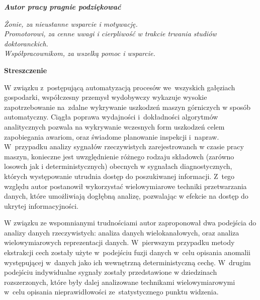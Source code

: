 \documentclass[a4paper,onecolumn,twoside,12pt]{mwrep}
\begin{document}
\vspace*{21\baselineskip}

\begin{center}
	\textit{
\textbf{Autor pracy pragnie podziękować}}
\end{center}

\begin{flushleft}
\vspace*{1\baselineskip}
\textit{Żonie, za nieustanne wsparcie i motywację.} \\
\vspace*{1\baselineskip}
\textit{Promotorowi, za cenne uwagi i cierpliwość w trakcie trwania studiów doktoranckich.} \\
\vspace*{1\baselineskip}
\textit{Współpracownikom, za wszelką pomoc i wsparcie.} \\


\end{flushleft}



\cleardoublepage
\thispagestyle{empty}
\newpage

\begin{center}
\textbf{Streszczenie}
\end{center}

W związku z~postępującą automatyzacją procesów we~wszyskich gałęziach gospodarki, współczesny przemysł wydobywczy wykazuje wysokie zapotrzebowanie na~zdalne wykrywanie uszkodzeń maszyn górniczych w sposób automatyczny. Ciągła poprawa wydajności i~dokładności algorytmów analitycznych pozwala na wykrywanie wczesnych form uszkodzeń celem zapobiegania awariom, oraz świadome planowanie inspekcji i~napraw. W~przypadku analizy sygnałów rzeczywistych zarejestrowanch w czasie pracy maszyn, konieczne jest uwzględnienie różnego rodzaju składowch (zarówno losowch jak i deterministycznych) obecnych w sygnałach diagnostycznych, których występowanie utrudnia dostęp do poszukiwanej informacji. Z~tego względu autor postanowił wykorzystać wielowymiarowe techniki przetwarzania danych, które umożliwiają dogłębną analizę, pozwalając w efekcie na dostęp do ukrytej informacyjności.

W związku ze wspomnianymi trudnościami autor zaproponował dwa podejścia do analizy danych rzeczywistych: analiza danych wielokanałowych, oraz analiza wielowymiarowych reprezentacji danych. W~pierwszym przypadku metody ekstrakcji cech zostały użyte w~podejściu fuzji danych w~celu opisania anomalii występującej w~danych jako ich wewnętrzną deterministyczną cechę. W~drugim podejściu indywidualne sygnały zostały przedstawione w dziedzinach rozszerzonych, które były dalej analizowane technikami wielowymiarowymi w~celu opisania nieprawidłowości ze~statystycznego punktu widzenia.
\end{document}
